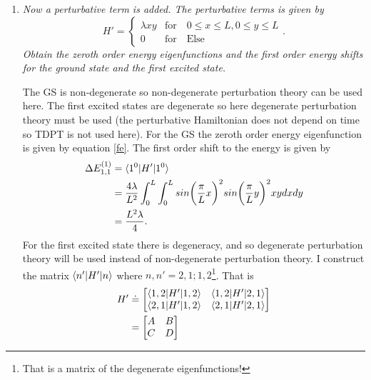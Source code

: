 \begin{example}
\begin{enumerate}
		\item \emph{Now a perturbative term is added. The perturbative terms is given by}
		\begin{equation}
			H'=\begin{cases} \lambda xy &\mbox{for} \quad 0\leq x\leq L, 0\leq y \leq L \\ 
				0 & \mbox{for} \quad \mbox{Else}  \end{cases} .
		\end{equation} 
		\emph{Obtain the zeroth order energy eigenfunctions and the first order energy shifts for the ground state and the first excited state.}\newline
		
		The GS is non-degenerate so non-degenerate perturbation theory can be used here. The first excited states are degenerate so here degenerate perturbation theory must be used (the perturbative Hamiltonian does not depend on time so TDPT is not used here).\newline 
		For the GS the zeroth order energy eigenfunction is given by equation \eqref{fe}. The first order shift to the energy is given by
		\begin{equation}
			\begin{split}
				\Delta E_{1,1}^{(1)}&= \braket{1^0|H'|1^0}\\
				&=\frac{4\lambda}{L^2}\int_{0}^{L}\int_{0}^{L}sin\bigg(\frac{\pi}{L}x\bigg)^2sin\bigg(\frac{\pi}{L}y\bigg)^2xydxdy\\
				&=\frac{L^2\lambda}{4}.
			\end{split}
			\label{FPE1}
		\end{equation} 
		For the first excited state there is degeneracy, and so degenerate perturbation theory will be used instead of non-degenerate perturbation theory. I construct the matrix $\braket{n'|H'|n}$ where $n,n'=2,1;1,2$\footnote{That is a matrix of the degenerate eigenfunctions!}. That is
		\begin{equation}
			\begin{split}
				H'&\doteq\begin{bmatrix}
					\braket{1,2|H'|1,2} & \braket{1,2|H'|2,1}\\
					\braket{2,1|H'|1,2} & \braket{2,1|H'|2,1}\\
				\end{bmatrix}\\
				&=\begin{bmatrix}
					A& B\\
					C& D\\
				\end{bmatrix}\\

\end{split}
\end{equation}
\end{enumerate}
\end{example}
